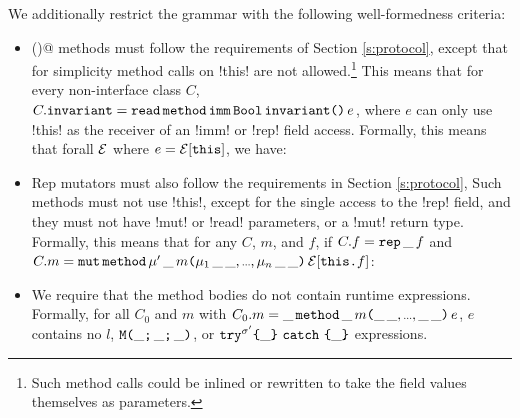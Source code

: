 We additionally restrict the grammar with the following well-formedness criteria:
\begin{itemize}
	\item \Q@invariant()@ methods must follow the requirements of Section \ref{s:protocol}, except that for simplicity method calls on \Q!this! are not allowed.\footnote{Such method calls could be inlined or rewritten to take the field values themselves as parameters.} This means that for every non-interface class $C$, $C.\texttt{invariant} = \texttt{read}\,\texttt{method}\,\texttt{imm}\,\texttt{Bool}\,\texttt{invariant}\texttt{(}\texttt{)}\,e$, where $e$ can only use \Q!this! as the receiver of an \Q!imm! or \Q!rep! field access. Formally, this means that forall $\mathcal{E}$ where $e = \mathcal{E}[\texttt{this}]$, we have:
	
	\item Rep mutators must also follow the requirements in Section \ref{s:protocol},
Such methods must not use \Q!this!, except for the single access to the \Q!rep! field, and they must not have \Q!mut! or \Q!read! parameters, or a \Q!mut! return type.
Formally, this means that for any $C$, $m$, and $f$, if $C.f = \texttt{rep}\,\_\,f$ and $C.m = \method{\Kw{mut}}{\mdf'\,\_}{m}{\drangex{\mdf}{\_\,\_}}{\E[\Kw{this}\D f]}$:

	\item We require that the method bodies do not contain runtime expressions. Formally, for all $C_0$ and $m$ with 
	$C_0.m = \method{\_}{\_}{m}{\rangex{\_\,\_}}{e}$, $e$ contains no $l$, $\texttt{M}\texttt{(}{}\_\texttt{;}\,\_\texttt{;}\,\_\texttt{)}$, or $\texttt{try}^{\sigma'}\texttt{\{}\_\texttt{\}}\ \texttt{catch}\ \texttt{\{}\_\texttt{\}}$ expressions.
	


\end{itemize}
